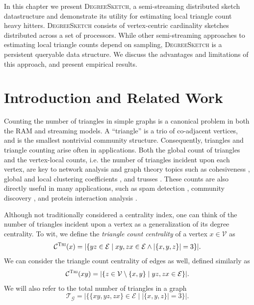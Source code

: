 \documentclass[10]{report}
\newcommand{\algoname}[1]{\textnormal{\textsc{#1}}}
\begin{document}
In this chapter we present \algoname{DegreeSketch}, a semi-streaming distributed sketch datastructure and demonstrate its utility for estimating local triangle count heavy hitters.
\algoname{DegreeSketch} consists of vertex-centric cardinality sketches distributed across a set of processors. 
While other semi-streaming approaches to estimating local triangle counts depend on sampling, \algoname{DegreeSketch} is a persistent queryable data structure.
We discuss the advantages and limitations of this approach, and present empirical results.

\section{Introduction and Related Work}
 \label{DS:sec:intro}

Counting the number of triangles in simple graphs is a canonical problem in both the RAM and streaming models.
A ``triangle'' is a trio of co-adjacent vertices, and is the smallest nontrivial community structure.
Consequently, triangles and triangle counting arise often in applications.
Both the global count of triangles and the vertex-local counts, i.e. the number of triangles incident upon each vertex, are key to network analysis and graph theory topics such as cohesiveness \cite{lim2015mascot}, global and local clustering coefficients \cite{tsourakakis2008fast}, and trusses \cite{cohen2008trusses}.
These counts are also directly useful in many applications, such as spam detection \cite{becchetti2010efficient},  community discovery \cite{wang2010triangulation, berry2011tolerating}, and protein interaction analysis \cite{milo2002network}.

Although not traditionally considered a centrality index, one can think of the number of triangles incident upon a vertex as a generalization of its degree centrality. 
To wit, we define the \emph{triangle count centrality} of a vertex $x \in \mathcal{V}$ as
%
\begin{equation}
	\mathcal{C}^{\algoname{Tri}}(x) = |\{yz \in \mathcal{E} \mid xy, zx \in \mathcal{E} \wedge |\{x, y, z\}| = 3\}|.
\end{equation}
%
We can consider the triangle count centrality of edges as well, defined similarly as
%
\begin{equation}
	\mathcal{C}^{\algoname{Tri}}(xy) = |\{z \in \mathcal{V} \setminus \{x,y\} \mid yz, zx \in \mathcal{E}\}|.
\end{equation}
%
We will also refer to the total number of triangles in a graph 
%
\begin{equation}
	\mathcal{T}_\mathcal{G} = |\{ \{xy, yz, zx\} \in \mathcal{E} \mid |\{x, y, z\}| = 3 \} |.
\end{equation}
%
\end{document}
